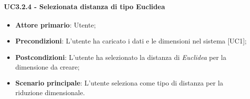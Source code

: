 \paragraph{UC3.2.4 - Selezionata distanza di tipo Euclidea}
\begin{itemize}
	\item \textbf{Attore primario}: Utente;
	\item \textbf{Precondizioni}: L'utente ha caricato i dati e le dimensioni nel sistema [UC1];
	\item \textbf{Postcondizioni}: L'utente ha selezionato la distanza di \textit{Euclidea} per la dimensione da creare;
	\item \textbf{Scenario principale}: L'utente seleziona  come tipo di distanza per la riduzione dimensionale.
\end{itemize}